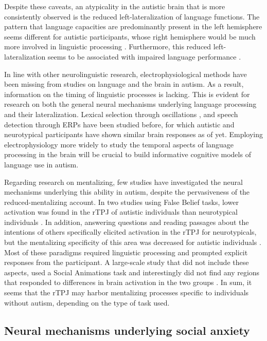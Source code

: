 Despite these caveats, an atypicality in the autistic brain that is more consistently observed is the reduced left-lateralization of language functions. The pattern that language capacities are predominantly present in the left hemisphere \citep{broca1865,szaflarski2006} seems different for autistic participants, whose right hemisphere would be much more involved in linguistic processing \citep{eyler2012,jouravlev2020,knaus2008,knaus2010}. Furthermore, this reduced left-lateralization seems to be associated with impaired language performance \citep{cermak2022,lindell2013}.

In line with other neurolinguistic research, electrophysiological methods have been missing from studies on language and the brain in autism. As a result, information on the timing of linguistic processes is lacking. This is evident for research on both the general neural mechanisms underlying language processing and their lateralization. Lexical selection through oscillations \citep{bloy2019}, and speech detection through ERPs \citep{kasai2005,oramcardy2005} have been studied before, for which autistic and neurotypical participants have shown similar brain responses as of yet. Employing electrophysiology more widely to study the temporal aspects of language processing in the brain will be crucial to build informative cognitive models of language use in autism. 

Regarding research on mentalizing, few studies have investigated the neural mechanisms underlying this ability in autism, despite the pervasiveness of the reduced-mentalizing account. In two studies using False Belief tasks, lower activation was found in the rTPJ of autistic individuals than neurotypical individuals \citep{nijhof2018,yuk2018}. In addition, answering questions and reading passages about the intentions of others specifically elicited activation in the rTPJ for neurotypicals, but the mentalizing specificity of this area was decreased for autistic individuals \citep{lombardo2011,mason2008}. Most of these paradigms required linguistic processing and prompted explicit responses from the participant. A large-scale study that did not include these aspects, used a Social Animations task and interestingly did not find any regions that responded to differences in brain activation in the two groups \citep{moessnang2020}. In sum, it seems that the rTPJ may harbor mentalizing processes specific to individuals without autism, depending on the type of task used.

\subsection{Neural mechanisms underlying social anxiety}

